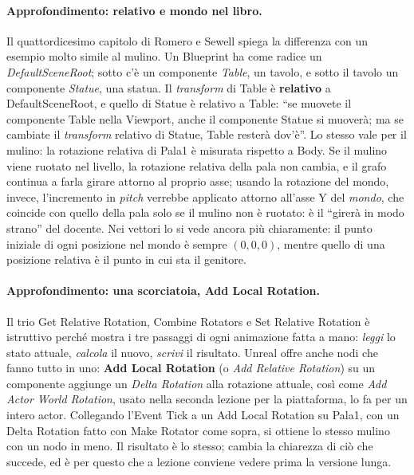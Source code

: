 \paragraph{Approfondimento: relativo e mondo nel libro.} Il quattordicesimo capitolo di
Romero e Sewell spiega la differenza con un esempio molto simile al mulino. Un
Blueprint ha come radice un \emph{DefaultSceneRoot}; sotto c'è un componente
\emph{Table}, un tavolo, e sotto il tavolo un componente \emph{Statue}, una statua. Il
\emph{transform} di Table è \textbf{relativo} a DefaultSceneRoot, e quello di Statue è
relativo a Table: ``se muovete il componente Table nella Viewport, anche il componente
Statue si muoverà; ma se cambiate il \emph{transform} relativo di Statue, Table resterà
dov'è''. Lo stesso vale per il mulino: la rotazione relativa di Pala1 è misurata
rispetto a Body. Se il mulino viene ruotato nel livello, la rotazione relativa della
pala non cambia, e il grafo continua a farla girare attorno al proprio asse; usando la
rotazione del mondo, invece, l'incremento in \emph{pitch} verrebbe applicato attorno
all'asse Y del \emph{mondo}, che coincide con quello della pala solo se il mulino non è
ruotato: è il ``girerà in modo strano'' del docente. Nei vettori lo si vede ancora più
chiaramente: il punto iniziale di ogni posizione nel mondo è sempre $(0,0,0)$, mentre
quello di una posizione relativa è il punto in cui sta il genitore.

\paragraph{Approfondimento: una scorciatoia, Add Local Rotation.} Il trio Get Relative
Rotation, Combine Rotators e Set Relative Rotation è istruttivo perché mostra i tre
passaggi di ogni animazione fatta a mano: \emph{leggi} lo stato attuale, \emph{calcola}
il nuovo, \emph{scrivi} il risultato. Unreal offre anche nodi che fanno tutto in uno:
\textbf{Add Local Rotation} (o \emph{Add Relative Rotation}) su un componente aggiunge
un \emph{Delta Rotation} alla rotazione attuale, così come \emph{Add Actor World
Rotation}, usato nella seconda lezione per la piattaforma, lo fa per un intero actor.
Collegando l'Event Tick a un Add Local Rotation su Pala1, con un Delta Rotation fatto
con Make Rotator come sopra, si ottiene lo stesso mulino con un nodo in meno. Il
risultato è lo stesso; cambia la chiarezza di ciò che succede, ed è per questo che a
lezione conviene vedere prima la versione lunga.

